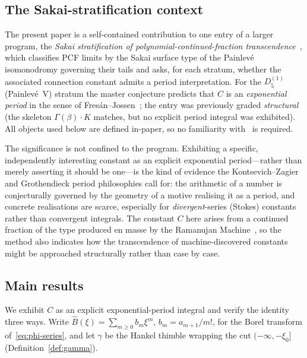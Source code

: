 \documentclass[11pt,reqno]{amsart}
\renewcommand{\_}{\vquadorigunderscore\allowbreak}
\theoremstyle{plain}
\theoremstyle{definition}
\newcommand{\Bhat}{\widehat{B}}
\newcommand{\xizero}{\xi_0}
\providecommand{\C}{}\renewcommand{\C}{C}
\begin{document}
\subsection{The Sakai-stratification context}
The present paper is a self-contained contribution to one entry of a larger program, the
\emph{Sakai stratification of polynomial-continued-fraction transcendence}~\cite{Sakai}, which
classifies PCF limits by the Sakai surface type of the Painlev\'e isomonodromy governing their
tails and asks, for each stratum, whether the associated connection constant admits a period
interpretation. For the $D_5^{(1)}$ (Painlev\'e~V) stratum the master conjecture predicts that
$\C$ is an \emph{exponential period} in the sense of Fres\'an--Jossen~\cite{FJ}; the entry was
previously graded \emph{structural} (the skeleton $\Gamma(\beta)\cdot K$ matches, but no explicit
period integral was exhibited). All objects used below are defined in-paper, so no familiarity
with~\cite{Sakai} is required.

The significance is not confined to the program. Exhibiting a specific, independently interesting
constant as an explicit exponential period---rather than merely asserting it should be one---is the
kind of evidence the Kontsevich--Zagier and Grothendieck period philosophies call for: the
arithmetic of a number is conjecturally governed by the geometry of a motive realising it as a
period, and concrete realisations are scarce, especially for \emph{divergent}-series (Stokes)
constants rather than convergent integrals. The constant $\C$ here arises from a continued fraction
of the type produced en masse by the Ramanujan Machine~\cite{RamanujanMachine}, so the method also
indicates how the transcendence of machine-discovered constants might be approached structurally
rather than case by case.

\subsection{Main results}
We exhibit $\C$ as an explicit exponential-period integral and verify the identity three
ways. Write $\Bhat(\xi)=\sum_{m\ge0}b_m\xi^m$, $b_m=a_{m+1}/m!$, for the Borel
transform of~\eqref{eq:phi-series}, and let $\gamma$ be the Hankel thimble wrapping the cut
$(-\infty,-\xizero]$ (Definition~\ref{def:gamma}).
\end{document}
